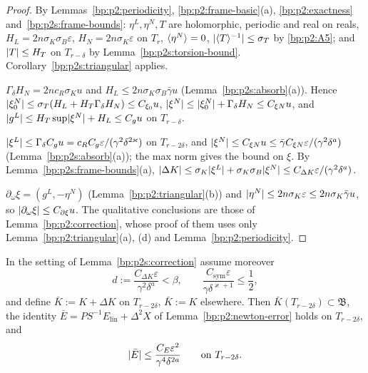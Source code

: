 \begin{proof}
\label{step:p2s:cor-data}
By Lemmas~\ref{bp:p2:periodicity}, \ref{bp:p2:frame-basic}(a), \ref{bp:p2:exactness} and~\ref{bp:p2s:frame-bounds}:
$\eta^L,\eta^N,T$ are holomorphic, periodic and real on reals, $H_L=2n\sigma_K\sigma_B\varepsilon$, $H_N=2n\sigma_K\varepsilon$ on $T_r$,
$\langle \eta^N\rangle=0$, $\lvert \langle T\rangle^{-1}\rvert\le\sigma_T$ by \ref{bp:p2:A5}; and $\lvert T\rvert\le H_T$ on $T_{r-\delta}$ by
Lemma~\ref{bp:p2s:torsion-bound}. Corollary~\ref{bp:p2s:triangular} applies.

\label{step:p2s:cor-n}
$\Gamma_\delta H_N=2nc_R\sigma_Ku$ and $H_L\le2n\sigma_K\sigma_B\bar\gamma u$ (Lemma~\ref{bp:p2s:absorb}(a)). Hence
$\lvert \xi^N_0\rvert\le\sigma_T(H_L+H_T\Gamma_\delta H_N)\le C_{\xi_0}u$, $\lvert \xi^N\rvert\le\lvert \xi^N_0\rvert+\Gamma_\delta H_N\le C_{\xi N}u$, and
$\lvert g^L\rvert\le H_T\sup\lvert \xi^N\rvert+H_L\le C_gu$ on $T_{r-\delta}$.

\label{step:p2s:cor-l}
$\lvert \xi^L\rvert\le\Gamma_\delta C_gu=c_RC_g\varepsilon/(\gamma^2\delta^{2\varkappa})$ on $T_{r-2\delta}$, and
$\lvert \xi^N\rvert\le C_{\xi N}u\le\bar\gamma C_{\xi N}\varepsilon/(\gamma^2\delta^a)$ (Lemma~\ref{bp:p2s:absorb}(a)); the max norm gives the
bound on $\xi$. By Lemma~\ref{bp:p2s:frame-bounds}(a), $\lvert \Delta K\rvert\le\sigma_K\lvert \xi^L\rvert+\sigma_K\sigma_B\lvert \xi^N\rvert\le
C_{\Delta K}\varepsilon/(\gamma^2\delta^a)$.

\label{step:p2s:cor-dxi}
$\partial_\omega\xi=(g^L,-\eta^N)$ (Lemma~\ref{bp:p2:triangular}(b)) and $\lvert \eta^N\rvert\le2n\sigma_K\varepsilon\le2n\sigma_K\bar\gamma u$, so
$\lvert \partial_\omega\xi\rvert\le C_{\partial\xi}u$. The qualitative conclusions are those of Lemma~\ref{bp:p2:correction}, whose proof of them
uses only Lemma~\ref{bp:p2:triangular}(a), (d) and Lemma~\ref{bp:p2:periodicity}.
\end{proof}

\begin{lemma}\label{bp:p2s:newton-error}
In the setting of Lemma~\ref{bp:p2s:correction} assume moreover
\[
d:=\frac{C_{\Delta K}\varepsilon}{\gamma^2\delta^a}<\beta,\qquad\frac{C_{\mathrm{sym}}\varepsilon}{\gamma\delta^{\varkappa+1}}\le\frac12,
\]
and define $\bar K:=K+\Delta K$ on $T_{r-2\delta}$, $\bar K:=K$ elsewhere. Then $\bar K(T_{r-2\delta})\subset\mathfrak B$, the
identity $\bar E=PS^{-1}E_{\mathrm{lin}}+\Delta^2X$ of Lemma~\ref{bp:p2:newton-error} holds on $T_{r-2\delta}$, and
\[
\lvert \bar E\rvert\le\frac{C_E\varepsilon^2}{\gamma^4\delta^{2a}}\qquad\text{on }T_{r-2\delta}.
\]
\end{lemma}

